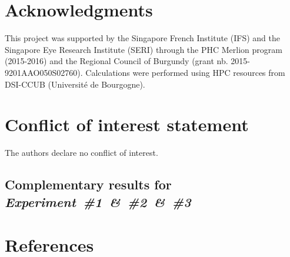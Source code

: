 \documentclass[review]{elsarticle}
\begin{document}
\section*{Acknowledgments}\label{sec:acknowledgements}

This project was supported by the Singapore French Institute (IFS) and the Singapore Eye Research Institute (SERI) through the PHC Merlion program (2015-2016) and the Regional Council of Burgundy (grant nb. 2015-9201AAO050S02760).
Calculations were performed using HPC resources from DSI-CCUB (Universit\'e de Bourgogne).


%

\section*{Conflict of interest statement}

The authors declare no conflict of interest.

\begin{appendices}
\section{Complementary results for \emph{Experiment~\#1~\&~\#2~\&~\#3}}\label{app:1}



\end{appendices}


\section*{References}
\end{document}
